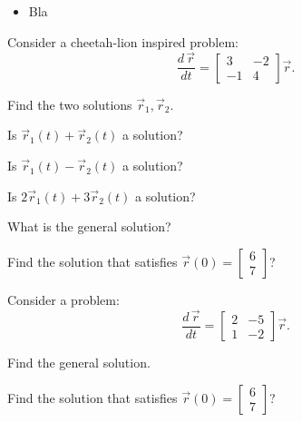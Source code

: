 \begin{lesson}

	\begin{itemize}
		\item Bla
	\end{itemize}
	

\end{lesson}




\question
Consider a cheetah-lion inspired problem:
$$
\frac{d \,\vec{r}}{dt} = \begin{bmatrix} 3 & -2 \\ -1 & 4\end{bmatrix} \vec{r}.
$$
	
\begin{parts}
	\item Find the two solutions $\vec{r}_1, \vec{r}_2$.
	\item Is $\vec{r}_1(t) + \vec{r}_2(t)$ a solution?
	\item Is $\vec{r}_1(t) - \vec{r}_2(t)$ a solution?
	\item Is $2\vec{r}_1(t) + 3\vec{r}_2(t)$ a solution?
	\item What is the general solution?
	\item Find the solution that satisfies $\vec{r}(0) = \begin{bmatrix} 6 \\ 7\end{bmatrix}$?
\end{parts}


\bookonlynewpage


\question
Consider a problem:
$$
\frac{d \,\vec{r}}{dt} = \begin{bmatrix} 2 & -5 \\ 1 & -2\end{bmatrix} \vec{r}.
$$
	
\begin{parts}
	\item Find the general solution.
	\item Find the solution that satisfies $\vec{r}(0) = \begin{bmatrix} 6 \\ 7\end{bmatrix}$?
\end{parts}




\bookonlynewpage


